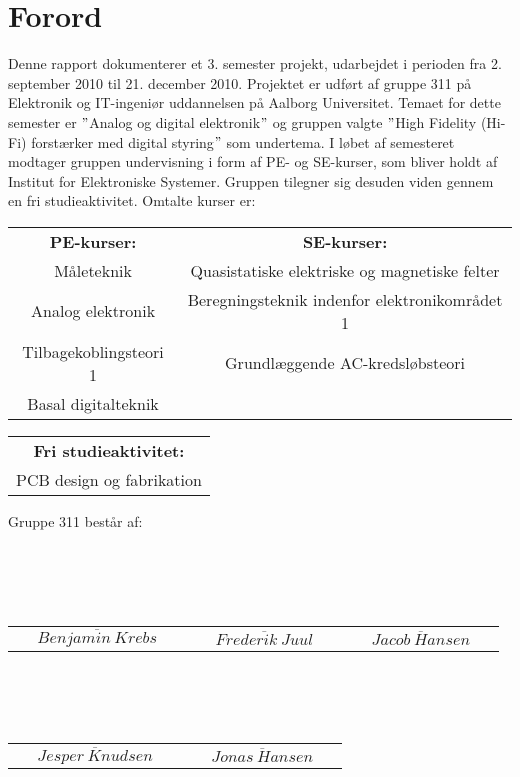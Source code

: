 \chapter*{Forord}
\label{forord}
Denne rapport dokumenterer et 3. semester projekt, udarbejdet i perioden fra 2. september 2010 til 21. december 2010. Projektet er udført af gruppe 311 på Elektronik og IT-ingeniør uddannelsen på Aalborg Universitet. Temaet for dette semester er $"$Analog og digital elektronik$"$ og gruppen valgte $"$High Fidelity (Hi-Fi) forstærker med digital styring$"$ som undertema. I løbet af semesteret modtager gruppen undervisning i form af PE- og SE-kurser, som bliver holdt af Institut for Elektroniske Systemer. Gruppen tilegner sig desuden viden gennem en fri studieaktivitet. Omtalte kurser er:

\begin{table}[h]
\centering
\begin{tabular}{c c}
\textbf{PE-kurser:} & \textbf{SE-kurser:} \\
Måleteknik & Quasistatiske elektriske og magnetiske felter \\
Analog elektronik & Beregningsteknik indenfor elektronikområdet 1 \\
Tilbagekoblingsteori 1 & Grundlæggende AC-kredsløbsteori \\
Basal digitalteknik & \\
\end{tabular}
\label{tab:kurser1}
\end{table}
\begin{table}[h]
\centering
\begin{tabular}{c}
\textbf{Fri studieaktivitet:} \\
PCB design og fabrikation \\
\end{tabular}
\label{tab:kurser2}
\end{table}

Gruppe 311 består af: \\\\\\\\\\
\begin{table}[h]
\centering
\begin{tabular}{c c c}
$\overline{~~~~~~Benjamin~Krebs~~~~~~}$ & $\overline{~~~~~~Frederik~Juul~~~~~~}$ & $\overline{~~~~~~Jacob~Hansen~~~~~~}$\\
\end{tabular}
\label{tab:gruppemedlemmer1}
\end{table} \\\\\\
\begin{table}[h]
\centering
\begin{tabular}{c c}
$\overline{~~~~~~Jesper~Knudsen~~~~~~}$ & $\overline{~~~~~~Jonas~Hansen~~~~~~}$\\
\end{tabular}
\label{tab:gruppemedlemmer2}
\end{table}